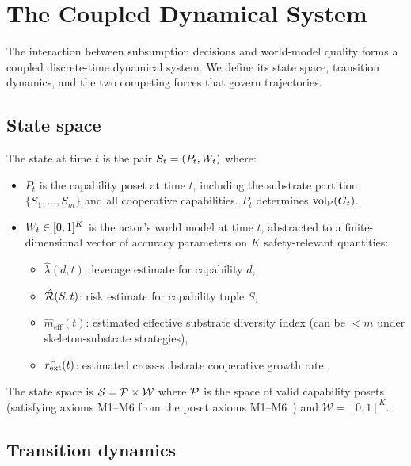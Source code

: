 \section{The Coupled Dynamical System}
\label{sec:coupled_system}

The interaction between subsumption decisions and world-model quality
forms a coupled discrete-time dynamical system.  We define its state
space, transition dynamics, and the two competing forces that govern
trajectories.

\subsection{State space}

\begin{definition}
\label{def:state}
The state at time $t$ is the pair $S_t = (P_t, W_t)$ where:
\begin{itemize}
\item $P_t$ is the capability poset at time $t$, including the
  substrate partition $\{S_1, \ldots, S_m\}$ and all cooperative
  capabilities.  $P_t$ determines ${\operatorname{vol}_{\mathrm{P}}}(G_t)$.
\item $W_t \in [0,1]^K$ is the actor's world model at time $t$,
  abstracted to a finite-dimensional vector of accuracy parameters on
  $K$ safety-relevant quantities:
  \begin{itemize}
  \item $\hat{\lambda}(d,t)$: leverage estimate for capability $d$,
  \item $\hat{\mathcal{R}}(S,t)$: risk estimate for capability tuple $S$,
  \item $\hat{m}_{\mathrm{eff}}(t)$: estimated effective substrate
    diversity index (can be $< m$ under skeleton-substrate strategies),
  \item $\hat{r_{\mathrm{ext}}}(t)$: estimated cross-substrate cooperative growth
    rate.
  \end{itemize}
\end{itemize}
The state space is $\mathcal{S} = \mathcal{P} \times \mathcal{W}$ where $\mathcal{P}$
is the space of valid capability posets (satisfying axioms M1--M6 from
the poset axioms M1--M6~\citep{lasser2026poset}) and $\mathcal{W} = [0,1]^K$.
\end{definition}

\subsection{Transition dynamics}

